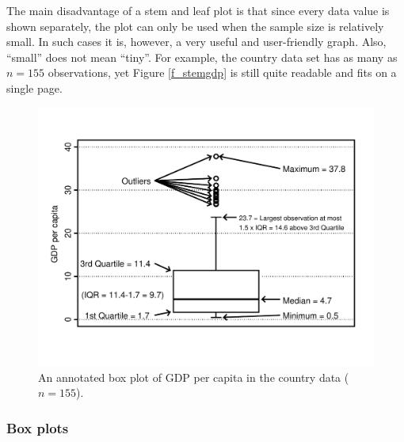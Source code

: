 The main disadvantage of a stem and leaf plot is that since every data
value is shown separately, the plot can only be used when the sample
size is relatively small. In such cases it is, however, a
very useful and user-friendly graph. Also, ``small'' does not mean
``tiny''. For example, the country data set has as many as $n=155$
observations, yet Figure \ref{f_stemgdp} is still quite readable and fits on a
single page.

\begin{figure}[t]
\caption{An annotated box plot of GDP per capita in the country data
($n=155$).}
\label{f_boxplot_gdp}
\begin{center}

\includegraphics[width=15cm]{box_gdp}

\end{center}
\end{figure}

\subsubsection{Box plots}

